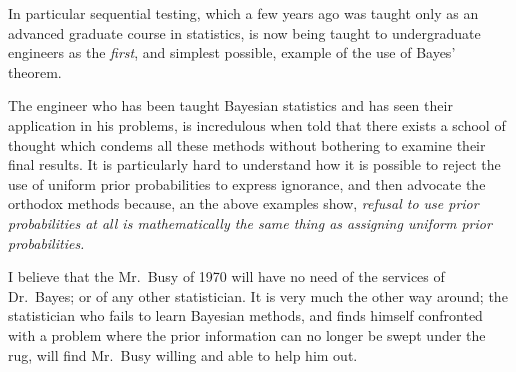 \documentclass[12pt]{article}
\begin{document}
In particular sequential testing, which a few years ago was taught
only as an advanced graduate course in statistics, is now being taught
to undergraduate engineers as the \emph{first}, and simplest possible, example of
the use of Bayes' theorem.

The engineer who has been taught Bayesian statistics and has
seen their application in his problems, is incredulous when told that
there exists a school of thought which condems all these methods without
bothering to examine their final results. It is particularly hard to
understand how it is possible to reject the use of uniform prior
probabilities to express ignorance, and then advocate the orthodox
methods because, an the above examples show, \emph{refusal to use prior
probabilities at all is mathematically the same thing as assigning uniform prior probabilities.}

I believe that the Mr.~Busy of 1970 will have no need of the
services of Dr.~Bayes; or of any other statistician. It is very much
the other way around; the statistician who fails to learn Bayesian
methods, and finds himself confronted with a problem where the
prior information can no longer be swept under the rug, will find
Mr.~Busy willing and able to help him out.



\end{document}
